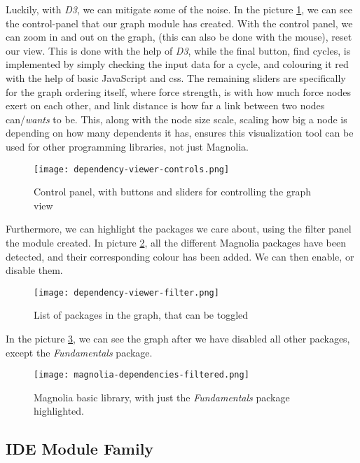 Luckily, with \textit{D3}, we can mitigate some of the noise. In the picture
\ref{pic:depCont}, we can see the control-panel that our graph module has
created. With the control panel, we can zoom in and out on the graph,
(this can also be done with the mouse), reset our view. This is done with the
help of \textit{D3}, while the final button, find cycles, is implemented by
simply checking the input data for a cycle, and colouring it red with the help
of basic JavaScript and \gls{css}. The remaining sliders are specifically for
the graph ordering itself, where force strength, is with how much force nodes
exert on each other, and link distance is how far a link between two nodes
can/\textit{wants} to be. This, along with the node size scale, scaling how big
a node is depending on how many dependents it has, ensures this visualization
tool can be used for other programming libraries, not just Magnolia.

\begin{figure}
  \centering
  \texttt{[image: dependency-viewer-controls.png]}
  \caption{
    Control panel, with buttons and sliders for controlling the graph view
  }
  \label{pic:depCont}
\end{figure}

Furthermore, we can highlight the packages we care about, using the filter
panel the module created. In picture \ref{pic:depFil}, all the different
Magnolia packages have been detected, and their corresponding colour has been
added. We can then enable, or disable them.

\begin{figure}
  \centering
  \texttt{[image: dependency-viewer-filter.png]}
  \caption{List of packages in the graph, that can be toggled}
  \label{pic:depFil}
\end{figure}

In the picture \ref{pic:depDis}, we can see the graph after we have disabled all
other packages, except the \textit{Fundamentals} package.

\begin{figure}
  \centering
  \texttt{[image: magnolia-dependencies-filtered.png]}
  \caption{
    Magnolia basic library, with just the \textit{Fundamentals} package
    highlighted.
  }
  \label{pic:depDis}
\end{figure}

\subsection{IDE Module Family}

